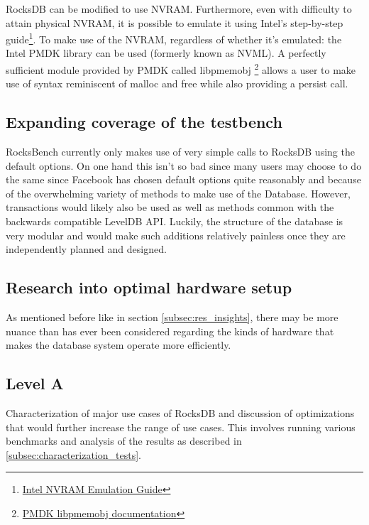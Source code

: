 \documentclass[twocolumn,11pt]{article}
\begin{document}
RocksDB can be modified to use NVRAM. Furthermore, even with difficulty to
attain physical NVRAM, it is possible to emulate it using Intel's step-by-step
guide\footnote{
  \href{https://software.intel.com/en-us/articles/how-to-emulate-persistent-memory-on-an-intel-architecture-server/}
  {Intel NVRAM Emulation Guide}}.
To make use of the NVRAM, regardless of whether it's emulated: the Intel PMDK
library can be used (formerly known as NVML). A perfectly sufficient module
provided by PMDK called libpmemobj
\footnote{\href{http://pmem.io/pmdk/libpmemobj/}
{PMDK libpmemobj documentation}} allows a user to make use of syntax reminiscent
of malloc and free while also providing a persist call.

\subsection{Expanding coverage of the testbench}

RocksBench currently only makes use of very simple calls to RocksDB using the
default options. On one hand this isn't so bad since many users may choose to do
the same since Facebook has chosen default options quite reasonably and because
of the overwhelming variety of methods to make use of the Database. However,
transactions would likely also be used as well as methods common with the
backwards compatible LevelDB API. Luckily, the structure of the database is very
modular and would make such additions relatively painless once they are
independently planned and designed.

\subsection{Research into optimal hardware setup}

As mentioned before like in section \ref{subsec:res_insights}, there may be more
nuance than has ever been considered regarding the kinds of hardware that makes
the database system operate more efficiently.

\subsection{Level A}

Characterization of major use cases of RocksDB and discussion of optimizations
that would further increase the range of use cases. This involves running
various benchmarks and analysis of the results as described in
\ref{subsec:characterization_tests}.
\end{document}
